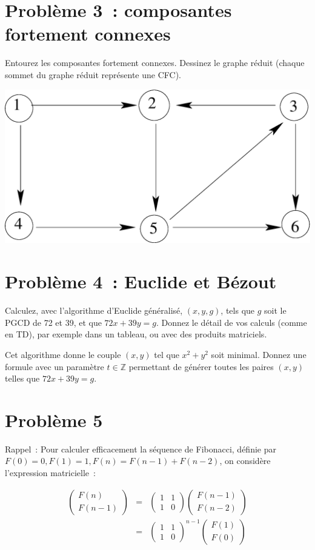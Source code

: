 \documentclass[11pt]{article}
\def\Z{\mathbb Z}
\begin{document}
\section{Problème 3~: composantes fortement connexes}
Entourez les composantes fortement connexes.
Dessinez le graphe réduit (chaque sommet du graphe réduit représente une CFC).

\begin{center}
\includegraphics[width=0.55\linewidth]{cfc.eps}
\end{center}

\section{Problème 4~: Euclide et Bézout}
Calculez, avec l'algorithme d'Euclide généralisé, $(x, y, g)$, tels que $g$ soit le PGCD de 72 et 39, 
et que
$72x+39y=g$. 
Donnez le détail de vos calculs (comme en TD), par exemple dans un tableau, ou avec des produits matriciels.

Cet algorithme donne le couple $(x, y)$ tel que
$x^2+y^2$ soit minimal.  
Donnez une formule avec un paramètre $t\in\Z$  permettant de générer toutes les paires  $(x, y)$ telles
que $72x+39y=g$. 

\section{Problème 5}
Rappel~: Pour calculer efficacement la séquence de Fibonacci, définie par
$F(0)=0, F(1)=1, F(n)= F(n-1)+F(n-2)$, on considère l'expression matricielle~:

\begin{eqnarray*}
 \left( \begin{array}{c} F(n) \\
 F(n-1)
\end{array}\right) &=& 
\left( \begin{array}{cc}  1 & 1 \\
1 & 0
\end{array}\right) \left(\begin{array}{c} F(n-1) \\
 F(n-2)\end{array}\right)   \\
&=& \left( \begin{array}{cc}  1 & 1 \\
1 & 0
\end{array}\right)^{n-1} \left(\begin{array}{c} F(1)\\
F(0)\end{array}\right)
\end{eqnarray*}
\end{document}
